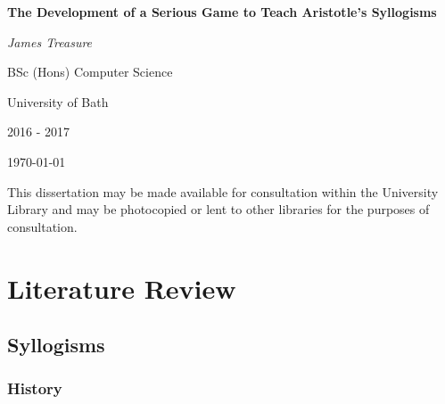 \documentclass[12pt,a4paper]{report}
\begin{document}
\begin{titlepage}
	\centering
	\vspace{1.5cm}
	{\huge\bfseries The Development of a Serious Game to Teach Aristotle's Syllogisms\par}
	\vspace{2cm}
	{\Large\itshape James Treasure\par}
	\vspace{2cm}
	BSc (Hons) Computer Science\par
	University of Bath\par
	2016 - 2017
	{\large \today\par}
\end{titlepage}

\newpage
\clearpage
\vspace*{\fill}
\begin{center}
\begin{minipage}{.8\textwidth}
This dissertation may be made available for consultation within the University
Library and may be photocopied or lent to other libraries for the purposes of consultation.

\end{minipage}
\end{center}
\vfill %
\clearpage

\begin{abstract}
Research shows that the learning process can be enhanced through the use of serious, educational games. The focus of this dissertation was to build a web game that taught the basics of mathematical logic including Aristotle's syllogisms and set theory. This project is also concerned with the user experience and user interface design necessary to create an immersive game. Whilst the technology used was not of primary importance some investigation was carried out on the tools available when creating web games.
\end{abstract}


\tableofcontents
\chapter{Literature Review}
\section{Syllogisms}
\subsection{History}
\end{document}
